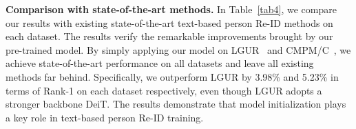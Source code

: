 \documentclass[10pt,twocolumn,letterpaper]{article}
\begin{document}
\noindent\textbf{Comparison with state-of-the-art methods.}
In Table~\ref{tab4}, we compare our results with existing state-of-the-art text-based person Re-ID methods on each dataset. The results verify the remarkable improvements brought by our pre-trained model. By simply applying our model on LGUR~\cite{LGUR} and CMPM/C~\cite{CMPM}, we achieve state-of-the-art performance on all datasets and leave all existing methods far behind. Specifically, we outperform LGUR by 3.98\% and 5.23\% in terms of Rank-1 on each dataset respectively, even though LGUR adopts a stronger backbone DeiT. The results demonstrate that model initialization plays a key role in text-based person Re-ID training.

\begin{table}[t]
\centering
\caption{Comparison with the state-of-the-art methods on text-based person Re-ID. We show the best score in bold and the second score underlined.}
\label{tab4}
\end{table}
\end{document}
